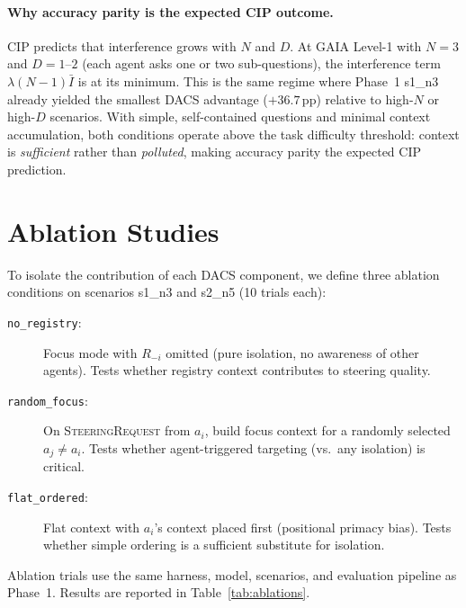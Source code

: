 \documentclass{article}
\begin{document}
\paragraph{Why accuracy parity is the expected CIP outcome.}
CIP predicts that interference grows with $N$ and $D$.
At GAIA Level-1 with $N{=}3$ and $D{=}1$--$2$
(each agent asks one or two sub-questions),
the interference term $\lambda(N{-}1)\bar{I}$ is at its minimum.
This is the same regime where Phase~1 s1\_n3 already yielded the
smallest DACS advantage ($+36.7$\,pp) relative to high-$N$ or
high-$D$ scenarios.
With simple, self-contained questions and minimal context accumulation,
both conditions operate above the task difficulty threshold:
context is \emph{sufficient} rather than \emph{polluted}, making
accuracy parity the expected CIP prediction.

\section{Ablation Studies}
\label{sec:ablations}

To isolate the contribution of each DACS component, we define three
ablation conditions on scenarios s1\_n3 and s2\_n5 (10 trials each):

\begin{description}
  \item[\texttt{no\_registry}:] Focus mode with $R_{-i}$ omitted
  (pure isolation, no awareness of other agents).
  Tests whether registry context contributes to steering quality.

  \item[\texttt{random\_focus}:] On \textsc{SteeringRequest} from $a_i$,
  build focus context for a randomly selected $a_j \neq a_i$.
  Tests whether agent-triggered targeting (vs.\ any isolation) is critical.

  \item[\texttt{flat\_ordered}:] Flat context with $a_i$'s context placed
  first (positional primacy bias).
  Tests whether simple ordering is a sufficient substitute for isolation.
\end{description}

Ablation trials use the same harness, model, scenarios, and evaluation
pipeline as Phase~1.
Results are reported in Table~\ref{tab:ablations}.
\end{document}
